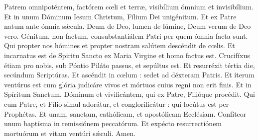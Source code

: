 Patrem omnipoténtem, factórem c{\oe}li et terr{\ae}, visibílium ómnium et invisibílium.
Et in unum Dóminum Iesum Christum, Fílium Dei unigénitum. Et ex Patre natum ante ómnia s{\'\ae}cula. Deum de Deo, lumen de lúmine, 
Deum verum de Deo vero. Génitum, non factum, consubstantiálem Patri per quem ómnia facta sunt. Qui propter nos hómines et propter 
nostram salútem descéndit de c{\oe}lis. Et incarnatus est de Spiritu Sancto ex Maria Virgine et homo factus est. Crucifíxus étiam pro nobis, 
sub Póntio Piláto passus, et sepúltus est. Et resurréxit tértia die, secúndum Scriptúras. Et ascéndit in c{\oe}lum : sedet ad déxteram Patris. 
Et íterum ventúrus est cum glória judicáre vivos et mórtuos cuius regni non erit finis. Et in Spíritum Sanctum, Dóminum et vivificántem, qui ex Patre, 
Filióque procédit. Qui cum Patre, et Fílio simul adorátur, et conglorificátur : qui locútus est per Prophétas. Et unam, sanctam, cathólicam, 
et apostólicam Ecclésiam. Confíteor unum baptísma in remissiónem peccatórum. Et expécto resurrectiónem mortuórum et vitam ventúri s{\'\ae}culi. Amen.